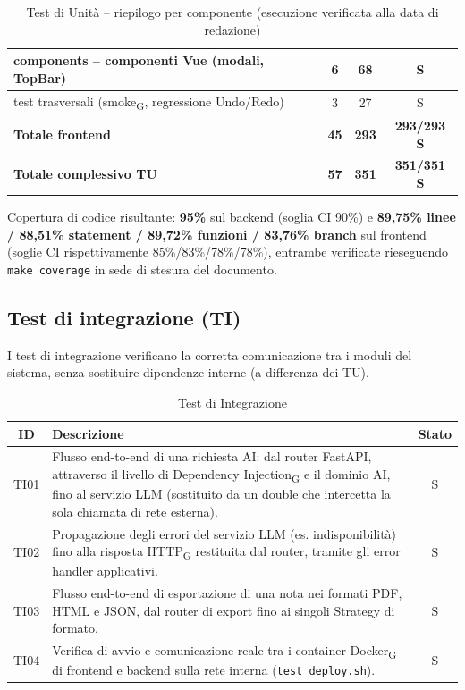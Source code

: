 \begin{table}[H]
\begin{tabularx}{\textwidth}{|X|c|c|c|}
        \hline
        components -- componenti Vue (modali, TopBar) & 6 & 68 & S \\
        \hline
        test trasversali (smoke\textsubscript{G}, regressione Undo/Redo) & 3 & 27 & S \\
        \hline
        \textbf{Totale frontend} & \textbf{45} & \textbf{293} & \textbf{293/293 S} \\
        \hline
        \rowcolor{primarycolor!10}
        \textbf{Totale complessivo TU} & \textbf{57} & \textbf{351} & \textbf{351/351 S} \\
        \hline
    \end{tabularx}
    \caption{Test di Unità -- riepilogo per componente (esecuzione verificata alla data di redazione)}
\end{table}
 
Copertura di codice risultante: \textbf{95\%} sul backend (soglia CI 90\%) e \textbf{89,75\% linee / 88,51\% statement / 89,72\% funzioni / 83,76\% branch} sul frontend (soglie CI rispettivamente 85\%/83\%/78\%/78\%), entrambe verificate rieseguendo \texttt{make coverage} in sede di stesura del documento.

\subsection{Test di integrazione (TI)}
I test di integrazione verificano la corretta comunicazione tra i moduli del sistema, senza sostituire dipendenze interne (a differenza dei TU).

\renewcommand{\arraystretch}{1.3}
\begin{table}[H]
    \centering
    \begin{tabularx}{\textwidth}{|c|X|c|}
        \hline
        \rowcolor{primarycolor!10}
        \textbf{ID} & \textbf{Descrizione} & \textbf{Stato} \\
        \hline
        TI01 & Flusso end-to-end di una richiesta AI: dal router FastAPI, attraverso il livello di Dependency Injection\textsubscript{G} e il dominio AI, fino al servizio LLM (sostituito da un double che intercetta la sola chiamata di rete esterna). & S \\
        \hline
        TI02 & Propagazione degli errori del servizio LLM (es. indisponibilità) fino alla risposta HTTP\textsubscript{G} restituita dal router, tramite gli error handler applicativi. & S \\
        \hline
        TI03 & Flusso end-to-end di esportazione di una nota nei formati PDF, HTML e JSON, dal router di export fino ai singoli Strategy di formato. & S \\
        \hline
        TI04 & Verifica di avvio e comunicazione reale tra i container Docker\textsubscript{G} di frontend e backend sulla rete interna (\texttt{test\_deploy.sh}). & S \\
        \hline
    \end{tabularx}
    \caption{Test di Integrazione}
\end{table}

